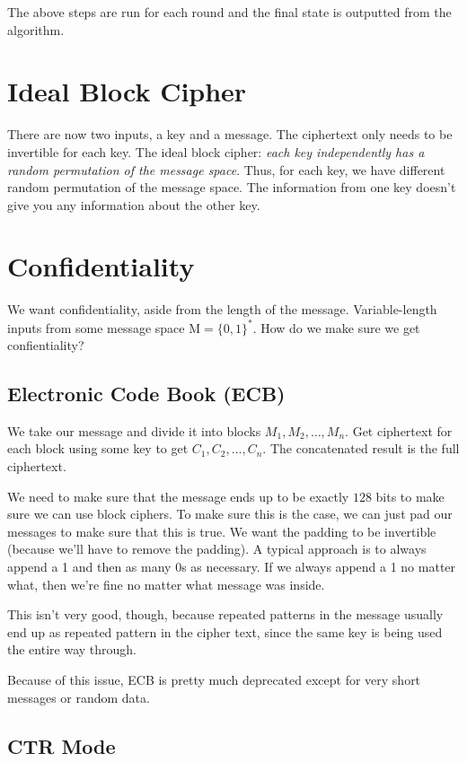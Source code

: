 \documentclass[psamsfonts]{amsart}
\begin{document}
The above steps are run for each round and the final state is outputted from the algorithm.

\section{Ideal Block Cipher}

There are now two inputs, a key and a message. The ciphertext only needs to be invertible for each key. The ideal block cipher: \emph{each key independently has a random permutation of the message space}. Thus, for each key, we have different random permutation of the message space. The information from one key doesn't give you any information about the other key.

\section{Confidentiality}

We want confidentiality, aside from the length of the message. Variable-length inputs from some message space $\mathrm{M} = \{0,1\}^{*}$. How do we make sure we get confientiality?

\subsection{Electronic Code Book (ECB)}

We take our message and divide it into blocks $M_1, M_2, \ldots, M_n$. Get ciphertext for each block using some key to get $C_1, C_2, \ldots, C_n$. The concatenated result is the full ciphertext.

We need to make sure that the message ends up to be exactly $128$ bits to make sure we can use block ciphers. To make sure this is the case, we can just pad our messages to make sure that this is true. We want the padding to be invertible (because we'll have to remove the padding). A typical approach is to always append a 1 and then as many 0s as necessary. If we always append a 1 no matter what, then we're fine no matter what message was inside.

This isn't very good, though, because repeated patterns in the message usually end up as repeated pattern in the cipher text, since the same key is being used the entire way through.

Because of this issue, ECB is pretty much deprecated except for very short messages or random data.

\subsection{CTR Mode}
\end{document}

